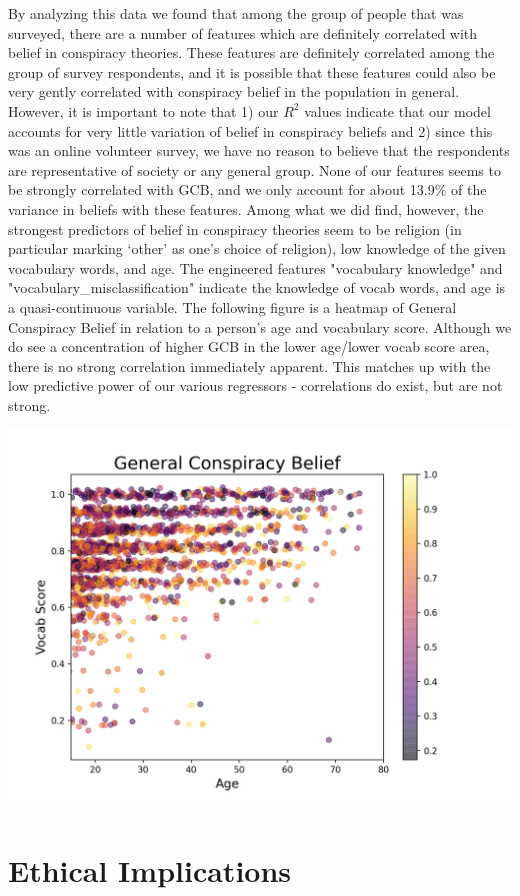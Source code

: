 \documentclass[11pt]{article}
\begin{document}
By analyzing this data we found that among the group of people that was
surveyed, there are a number of features which are definitely correlated
with belief in conspiracy theories. These features are definitely
correlated among the group of survey respondents, and it is possible
that these features could also be very gently correlated with conspiracy
belief in the population in general. However, it is important to note
that 1) our \(R^2\) values indicate that our model accounts for very
little variation of belief in conspiracy beliefs and 2) since this was
an online volunteer survey, we have no reason to believe that the
respondents are representative of society or any general group.
None of our features seems to be strongly correlated with GCB, and we only account for about 13.9$\%$ of the variance in beliefs with these features. Among what we did find, however, the strongest predictors of belief in conspiracy theories seem to be religion (in particular marking ‘other’ as one’s choice of religion), low knowledge of the given vocabulary words, and age. The engineered features "vocabulary knowledge" and "vocabulary\_misclassification" indicate the knowledge of vocab words, and age is a quasi-continuous variable. The following figure is a heatmap of General Conspiracy Belief in relation to a person’s age and vocabulary score. Although we do see a concentration of higher GCB in the lower age/lower vocab score area, there is no strong correlation immediately apparent. This matches up with the low predictive power of our various regressors - correlations do exist, but are not strong.
\begin{center}
\includegraphics[scale=1.2]{"../VocabAge_GCB.png"}
\end{center}
    \hypertarget{ethical-implications}{%
\section*{Ethical Implications}\label{ethical-implications}}
\end{document}
